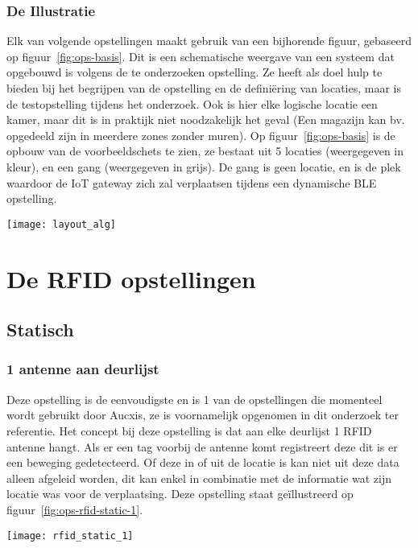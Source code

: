 \subsubsection{De Illustratie}
\begin{minipage}{0.65\textwidth}
Elk van volgende opstellingen maakt gebruik van een bijhorende figuur, gebaseerd op figuur~\ref{fig:ops-basis}. Dit is een schematische weergave van een systeem dat opgebouwd is volgens de te onderzoeken opstelling. Ze heeft als doel hulp te bieden bij het begrijpen van de opstelling en de definiëring van locaties, maar is de testopstelling tijdens het onderzoek. Ook is hier elke logische locatie een kamer, maar dit is in praktijk niet noodzakelijk het geval (Een magazijn kan bv. opgedeeld zijn in meerdere zones zonder muren). Op figuur~\ref{fig:ops-basis} is de opbouw van de voorbeeldschets te zien, ze bestaat uit 5 locaties (weergegeven in kleur), en een gang (weergegeven in grijs). De gang is geen locatie, en is de plek waardoor de IoT gateway zich zal verplaatsen tijdens een dynamische BLE opstelling.
\end{minipage}
\hfill
\begin{minipage}{0.30\textwidth}
	\texttt{[image: layout\_alg]}
	\label{fig:ops-basis}
\end{minipage}

\section[RFID]{De RFID opstellingen}
\label{sec:ops-rfid}

\subsection{Statisch}
\subsubsection{1 antenne aan deurlijst}
\begin{minipage}{0.65\textwidth}
Deze opstelling is de eenvoudigste en is 1 van de opstellingen die momenteel wordt gebruikt door Aucxis, ze is voornamelijk opgenomen in dit onderzoek ter referentie. Het concept bij deze opstelling is dat aan elke deurlijst 1 RFID antenne hangt. Als er een tag voorbij de antenne komt registreert deze dit is er een beweging gedetecteerd. Of deze in of uit de locatie is kan niet uit deze data alleen afgeleid worden, dit kan enkel in combinatie met de informatie wat zijn locatie was voor de verplaatsing. Deze opstelling staat geïllustreerd op figuur~\ref{fig:ops-rfid-static-1}.
\end{minipage}
\hfill
\begin{minipage}{0.30\textwidth}
	\texttt{[image: rfid\_static\_1]}
	\label{fig:ops-rfid-static-1}
\end{minipage}

